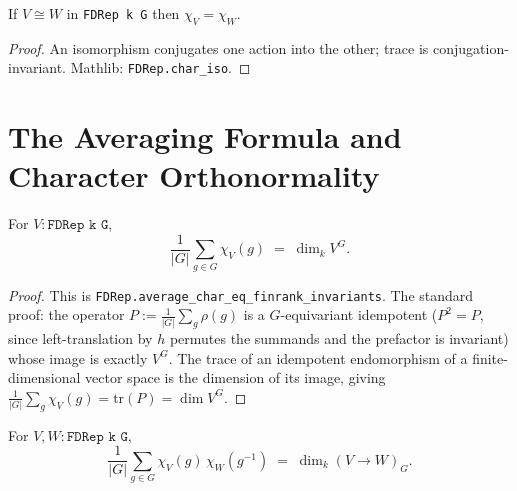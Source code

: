 \begin{lemma}
  \label{lem:char-iso}
  \mathlibok
  If $V \cong W$ in \texttt{FDRep k G} then $\chi_V = \chi_W$.
\end{lemma}

\begin{proof}
  \leanok
  An isomorphism conjugates one action into the other; trace is conjugation-invariant.
  Mathlib: \texttt{FDRep.char\_iso}.
\end{proof}

\section{The Averaging Formula and Character Orthonormality}

\begin{theorem}
  \label{thm:avg-char-eq-invariants}
  \mathlibok
  For $V : \texttt{FDRep k G}$,
  \[
    \frac{1}{|G|}\sum_{g \in G} \chi_V(g) \;=\; \dim_k V^G.
  \]
\end{theorem}

\begin{proof}
  \leanok
  This is \texttt{FDRep.average\_char\_eq\_finrank\_invariants}.
  The standard proof: the operator $P := \frac{1}{|G|}\sum_g \rho(g)$ is a
  $G$-equivariant idempotent ($P^2 = P$, since left-translation by $h$
  permutes the summands and the prefactor is invariant) whose image is exactly
  $V^G$. The trace of an idempotent endomorphism of a finite-dimensional
  vector space is the dimension of its image, giving
  $\frac{1}{|G|}\sum_g\chi_V(g) = \mathrm{tr}(P) = \dim V^G$.
\end{proof}

\begin{theorem}
  \label{thm:hom-space-dim-via-char}
  \mathlibok
  For $V, W : \texttt{FDRep k G}$,
  \[
    \frac{1}{|G|}\sum_{g \in G} \chi_V(g)\, \chi_W(g^{-1})
    \;=\; \dim_k(V \to W)_G.
  \]
\end{theorem}

